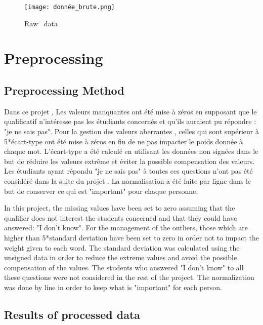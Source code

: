 \documentclass[12pt]{article}
\begin{document}
\begin{figure}[h]
\begin{center}
\texttt{[image: donnée\_brute.png]} 
\caption[]{ Raw \ data}
\end{center}
\end{figure}


\section{Preprocessing}

\subsection{Preprocessing Method}

Dans ce projet , Les valeurs manquantes ont été mise à zéros en supposant que le qualificatif n'intéresse pas les étudiants concernés et qu'ils auraient pu  répondre : "je ne sais pas".
Pour la gestion des valeurs aberrantes , celles qui sont  supérieur à 5*écart-type ont été mise à zéros en fin de ne pas impacter le poids donnée à chaque  mot. L'écart-type a été calculé en utilisant les données non signées dans le but de réduire les valeurs extrême et éviter la possible compensation des valeurs.
Les étudiants ayant répondu "je ne sais pas" à toutes ces questions n'ont pas été considéré dans la suite du projet .  
La normalisation a été faite par ligne dans le but de conserver ce qui est "important" pour chaque personne. 



In this project, the missing values have been set to zero assuming that the qualifier does not interest the students concerned and that they could have answered: "I don't know".
For the management of the outliers, those which are higher than 5*standard deviation have been set to zero in order not to impact the weight given to each word. The standard deviation was calculated using the unsigned data in order to reduce the extreme values and avoid the possible compensation of the values.
The students who answered "I don't know" to all these questions were not considered in the rest of the project.  
The normalization was done by line in order to keep what is "important" for each person. 


\subsection{Results of processed data}
\end{document}
